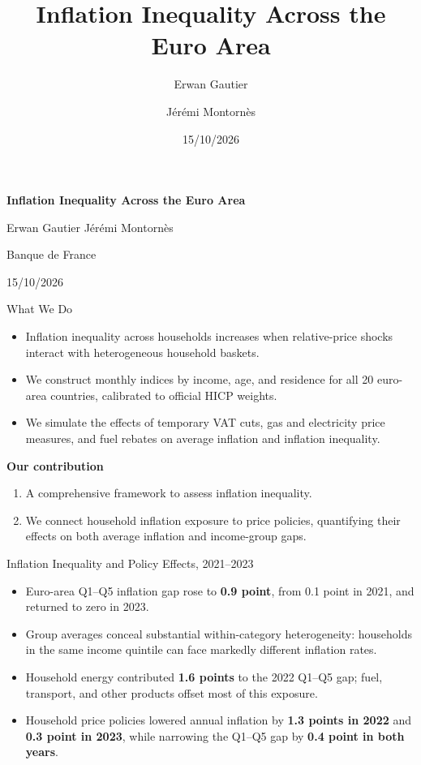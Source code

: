 \documentclass[11pt,aspectratio=169]{beamer}
\title{Inflation Inequality Across the Euro Area}
\author{Erwan Gautier \and J\'er\'emi Montorn\`es}
\institute{Banque de France}
\date{15/10/2026}
\begin{document}
\begin{frame}[plain]
  \centering
  \vspace{0.20\textheight}
  {\LARGE\bfseries Inflation Inequality Across the Euro Area\par}
  \vspace{1.2em}
  {\large Erwan Gautier \qquad J\'er\'emi Montorn\`es\par}
  \vspace{0.6em}
  {\normalsize Banque de France\par}
  \vspace{0.6em}
  {\normalsize 15/10/2026\par}
\end{frame}

\begin{frame}{What We Do}
\begin{itemize}
  \item Inflation inequality across households increases when relative-price shocks interact with heterogeneous household baskets.
  \item We construct monthly indices by income, age, and residence for all 20 euro-area countries, calibrated to official HICP weights.
  \item We simulate the effects of temporary VAT cuts, gas and electricity price measures, and fuel rebates on average inflation and inflation inequality.
\end{itemize}
\vspace{0.5em}
\textbf{Our contribution}
\begin{enumerate}
  \item A comprehensive framework to assess inflation inequality.
  \item We connect household inflation exposure to price policies, quantifying their effects on both average inflation and income-group gaps.
\end{enumerate}
\end{frame}

\begin{frame}{Inflation Inequality and Policy Effects, 2021--2023}
\begin{itemize}
  \item Euro-area Q1--Q5 inflation gap rose to \textbf{0.9 point}, from 0.1 point in 2021, and returned to zero in 2023.
  \item Group averages conceal substantial within-category heterogeneity: households in the same income quintile can face markedly different inflation rates.
  \item Household energy contributed \textbf{1.6 points} to the 2022 Q1--Q5 gap; fuel, transport, and other products offset most of this exposure.
  \item Household price policies lowered annual inflation by \textbf{1.3 points in 2022} and \textbf{0.3 point in 2023}, while narrowing the Q1--Q5 gap by \textbf{0.4 point in both years}.
\end{itemize}
\end{frame}
\end{document}
